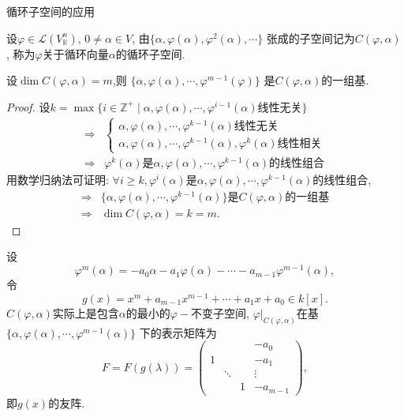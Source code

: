 循环子空间的应用

\begin{definition}
  设$\varphi \in \mathcal{L}(V^n_{\mathbb{K}})$,
  $0 \neq \alpha \in V$,
  由$\{\alpha, \varphi(\alpha), \varphi^2(\alpha),\cdots\}$
  张成的子空间记为$C(\varphi,\alpha)$,
  称为$\varphi$关于循环向量$\alpha$的循环子空间.
\end{definition}

\begin{theory}
  设$\dim C(\varphi,\alpha)=m$,则
  $\{\alpha, \varphi(\alpha), \cdots, \varphi^{m-1}(\varphi)\}$
  是$C(\varphi,\alpha)$的一组基.
\end{theory}

\begin{proof}
  设$k=\max\{i\in \mathbb{Z}^+ \mid \alpha,\varphi(\alpha),\cdots,\varphi^{i-1}(\alpha)\text{线性无关}\}$
  \begin{align*}
      \Longrightarrow &
                        \begin{cases}
                          \alpha, \varphi(\alpha),\cdots,\varphi^{k-1}(\alpha)\text{线性无关}\\
                          \alpha,\varphi(\alpha),\cdots,\varphi^{k-1}(\alpha),\varphi^k(\alpha)\text{线性相关}
                        \end{cases}\\
    \Longrightarrow & \varphi^k(\alpha)\text{是}\alpha, \varphi(\alpha), \cdots, \varphi^{k-1}(\alpha)\text{的线性组合}                    
  \end{align*}
  用数学归纳法可证明: 
  $\forall i \geq k,
  \varphi^i(\alpha)\text{是}\alpha, \varphi(\alpha), \cdots, \varphi^{k-1}(\alpha)\text{的线性组合}$,
  \begin{align*}
    \Longrightarrow & \{\alpha, \varphi(\alpha),\cdots,\varphi^{k-1}(\alpha)\}
                      \text{是$C(\varphi,\alpha)$的一组基}\\
    \Longrightarrow & \dim C(\varphi,\alpha)=k=m.
  \end{align*}
\end{proof}

\begin{notice}
  设
  \[\varphi^m(\alpha)=-a_0\alpha-a_1\varphi(\alpha)-\cdots-a_{m-1}\varphi^{m-1}(\alpha),\]
  令
  \[g(x)=x^m+a_{m-1}x^{m-1}+\cdots+a_1x+a_0 \in k[x].\]
  $C(\varphi,\alpha)$实际上是包含$\alpha$的最小的$\varphi-$不变子空间,
  $\varphi|_{C(\varphi,\alpha)}$在基$\{\alpha,\varphi(\alpha),\cdots,\varphi^{m-1}(\alpha)\}$
  下的表示矩阵为
  \[F=F(g(\lambda))=
    \begin{pmatrix}
      &&&-a_0\\
      1&&&-a_1\\
      &\ddots&&\vdots\\
      &&1&-a_{m-1}
    \end{pmatrix},
  \]
  即$g(x)$的友阵.
\end{notice}

